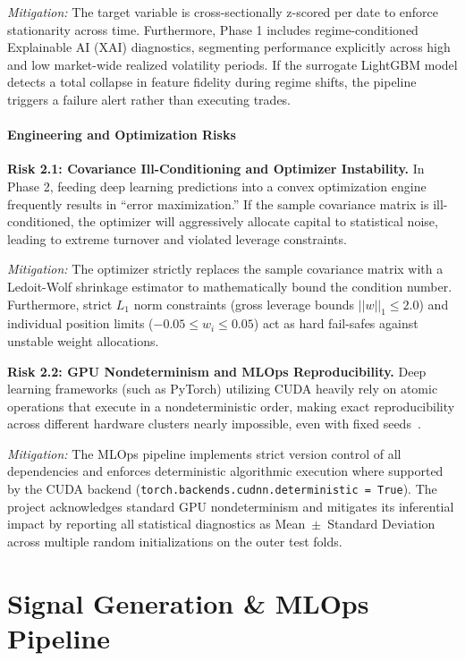\documentclass[twoside,final]{hcmut-report}
\begin{document}
\textit{Mitigation:} The target variable is cross-sectionally z-scored per date to enforce stationarity across time. Furthermore, Phase 1 includes regime-conditioned Explainable AI (XAI) diagnostics, segmenting performance explicitly across high and low market-wide realized volatility periods. If the surrogate LightGBM model detects a total collapse in feature fidelity during regime shifts, the pipeline triggers a failure alert rather than executing trades.

\subsection{Engineering and Optimization Risks}

\textbf{Risk 2.1: Covariance Ill-Conditioning and Optimizer Instability.} In Phase 2, feeding deep learning predictions into a convex optimization engine frequently results in ``error maximization.'' If the sample covariance matrix is ill-conditioned, the optimizer will aggressively allocate capital to statistical noise, leading to extreme turnover and violated leverage constraints.

\textit{Mitigation:} The optimizer strictly replaces the sample covariance matrix with a Ledoit-Wolf shrinkage estimator to mathematically bound the condition number. Furthermore, strict $L_1$ norm constraints (gross leverage bounds $||w||_1 \le 2.0$) and individual position limits ($-0.05 \le w_i \le 0.05$) act as hard fail-safes against unstable weight allocations.

\textbf{Risk 2.2: GPU Nondeterminism and MLOps Reproducibility.} Deep learning frameworks (such as PyTorch) utilizing CUDA heavily rely on atomic operations that execute in a nondeterministic order, making exact reproducibility across different hardware clusters nearly impossible, even with fixed seeds~\cite{Picard2021}.

\textit{Mitigation:} The MLOps pipeline implements strict version control of all dependencies and enforces deterministic algorithmic execution where supported by the CUDA backend (\texttt{torch.backends.cudnn.deterministic = True}). The project acknowledges standard GPU nondeterminism and mitigates its inferential impact by reporting all statistical diagnostics as Mean~$\pm$~Standard Deviation across multiple random initializations on the outer test folds.

\newpage
\part{Signal Generation \& MLOps Pipeline}
\end{document}
